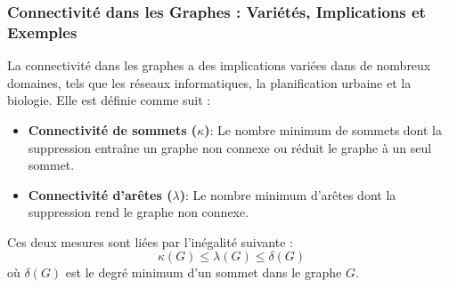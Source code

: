 \begin{frame}
\frametitle{Connectivité dans les Graphes : Variétés, Implications et Exemples}
    \begin{tcolorbox}[colback=orange!10,colframe=orange!100!black,
        title=La connectivité dans les graphes]
        La connectivité dans les graphes a des implications variées dans de nombreux domaines, tels que les réseaux informatiques, la planification urbaine et la biologie. Elle est définie comme suit :
        \begin{itemize}
            \item \textbf{Connectivité de sommets ($\kappa$)}: Le nombre minimum de sommets dont la suppression entraîne un graphe non connexe ou réduit le graphe à un seul sommet.
            \item \textbf{Connectivité d'arêtes ($\lambda$)}: Le nombre minimum d'arêtes dont la suppression rend le graphe non connexe.
        \end{itemize}
        Ces deux mesures sont liées par l'inégalité suivante :
        $$ \kappa(G) \leq \lambda(G) \leq \delta(G) $$
        où $\delta(G)$ est le degré minimum d'un sommet dans le graphe $G$.
    \end{tcolorbox}
\end{frame}
